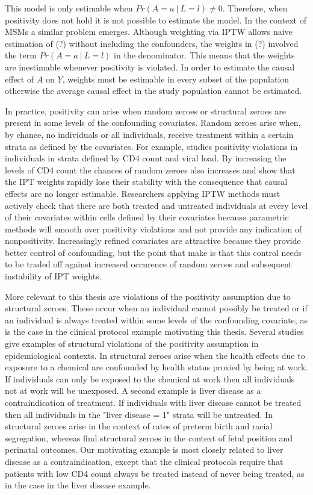 \documentclass[11pt]{article}
\begin{document}
This model is only estimable when \(Pr(A=a\ |\ L=l) \neq 0\). Therefore,
when positivity does not hold it is not possible to estimate the model.
In the context of MSMs a similar problem emerges. Although weighting via
IPTW allows naive estimation of (?) without including the confounders,
the weights in (?) involved the term \(Pr(A=a\ |\ L=l)\) in the
denominator. This means that the weights are inestimable whenever
positivity is violated. In order to estimate the causal effect of \(A\)
on \(Y\), weights must be estimable in every subset of the population
otherwise the average causal effect in the study population cannot be
estimated.

In practice, positivity can arise when random zeroes or structural
zeroes are present in some levels of the confounding covariates. Random
zeroes arise when, by chance, no individuals or all individuals, receive
treatment within a certain strata as defined by the covariates. For
example, \citet{Cole2008} studies positivity violations in individuals
in strata defined by CD4 count and viral load. By increasing the levels
of CD4 count the chances of random zeroes also increases and
\citet{Cole2008} show that the IPT weights rapidly lose their stability
with the consequence that causal effects are no longer estimable.
Researchers applying IPTW methods must actively check that there are
both treated and untreated individuals at every level of their
covariates within cells defined by their covariates because parametric
methods will smooth over positivity violations and not provide any
indication of nonpositivity. Increasingly refined covariates are
attractive because they provide better control of confounding, but the
point that \citet{Cole2008} make is that this control needs to be traded
off against increased occurence of random zeroes and subsequent
instability of IPT weights.

More relevant to this thesis are violations of the positivity assumption
due to structural zeroes. These occur when an individual cannot possibly
be treated or if an individual is always treated within some levels of
the confounding covariate, as is the case in the clinical protocol
example motivating this thesis. Several studies give examples of
structural violations of the positivity assumption in epidemiological
contexts. In \citet{Cole2008} structural zeroes arise when the health
effects due to exposure to a chemical are confounded by health status
proxied by being at work. If individuals can only be exposed to the
chemical at work then all individuals not at work will be unexposed. A
second example is liver disease as a contraindication of treatment. If
individuals with liver disease cannot be treated then all individuals in
the "liver disease = 1" strata will be untreated. In \citet{Messer2010}
structural zeroes arise in the context of rates of preterm birth and
racial segregation, whereas \citet{Cheng2010} find structural zeroes in
the context of fetal position and perinatal outcomes. Our motivating
example is most closely related to liver disease as a contraindication,
except that the clinical protocols require that patients with low CD4
count always be treated instead of never being treated, as in the case
in the liver disease example.
\end{document}
